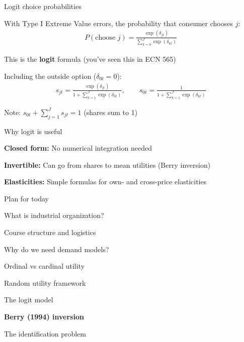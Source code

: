 \documentclass[notes,11pt, aspectratio=169]{beamer}
\newenvironment{wideitemize}{\itemize\addtolength{\itemsep}{10pt}}{\enditemize}
\newenvironment{wideenumerate}{\enumerate\addtolength{\itemsep}{10pt}}{\endenumerate}
\begin{document}
\begin{frame}{Logit choice probabilities}
	\begin{wideitemize}
		\item With Type I Extreme Value errors, the probability that consumer chooses $j$:
		\begin{align*}
			P(\text{choose } j) = \frac{\exp(\delta_{jt})}{\sum_{k=0}^J \exp(\delta_{kt})}
		\end{align*}
		\item This is the \textbf{logit} formula (you've seen this in ECN 565)
		\item Including the outside option ($\delta_{0t} = 0$):
		\begin{align*}
			s_{jt} = \frac{\exp(\delta_{jt})}{1 + \sum_{k=1}^J \exp(\delta_{kt})}, \qquad s_{0t} = \frac{1}{1 + \sum_{k=1}^J \exp(\delta_{kt})}
		\end{align*}
		\item Note: $s_{0t} + \sum_{j=1}^J s_{jt} = 1$ (shares sum to 1)
	\end{wideitemize}
\end{frame}

\begin{frame}{Why logit is useful}
	\begin{wideitemize}
		\item \textbf{Closed form:} No numerical integration needed
		\item \textbf{Invertible:} Can go from shares to mean utilities (Berry inversion)
		\item \textbf{Elasticities:} Simple formulas for own- and cross-price elasticities
	\end{wideitemize}
\end{frame}


\begin{frame}{Plan for today}
  \begin{wideenumerate}
    \item What is industrial organization?
    \item Course structure and logistics
    \item Why do we need demand models?
    \item Ordinal vs cardinal utility
    \item Random utility framework
    \item The logit model
    \item \textbf{Berry (1994) inversion}
    \item The identification problem
  \end{wideenumerate}
\end{frame}
\end{document}
